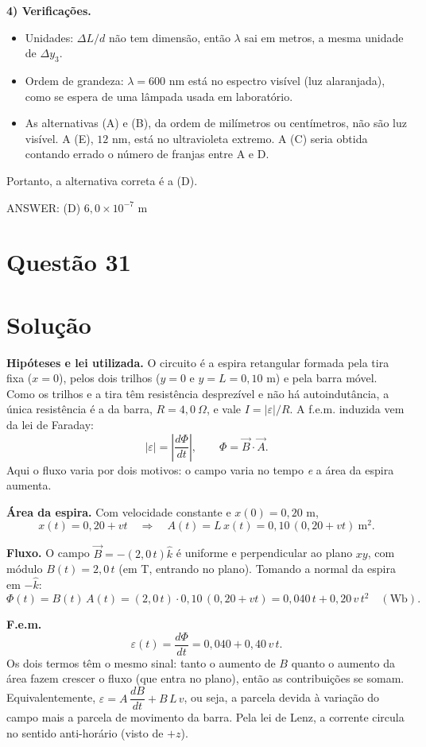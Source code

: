 \documentclass{article}%
\begin{document}
\textbf{4) Verificações.}
\begin{itemize}
\item Unidades: $\Delta L/d$ não tem dimensão, então $\lambda$ sai em metros, a mesma unidade de $\Delta y_3$.
\item Ordem de grandeza: $\lambda = 600$ nm está no espectro visível (luz alaranjada), como se espera de uma lâmpada usada em laboratório.
\item As alternativas (A) e (B), da ordem de milímetros ou centímetros, não são luz visível. A (E), $12$ nm, está no ultravioleta extremo. A (C) seria obtida contando errado o número de franjas entre A e D.
\end{itemize}

Portanto, a alternativa correta é a (D).

ANSWER: (D) $6{,}0\times10^{-7}$ m%
\newpage%
\section*{Questão 31}

\section*{Solução}

\textbf{Hipóteses e lei utilizada.} O circuito é a espira retangular formada pela tira fixa ($x=0$), pelos dois trilhos ($y=0$ e $y=L=0{,}10$ m) e pela barra móvel. Como os trilhos e a tira têm resistência desprezível e não há autoindutância, a única resistência é a da barra, $R=4{,}0\ \Omega$, e vale $I=|\varepsilon|/R$. A f.e.m. induzida vem da lei de Faraday:
\[
|\varepsilon| = \left|\frac{d\Phi}{dt}\right|, \qquad \Phi = \vec B\cdot \vec A .
\]
Aqui o fluxo varia por dois motivos: o campo varia no tempo \emph{e} a área da espira aumenta.

\textbf{Área da espira.} Com velocidade constante e $x(0)=0{,}20$ m,
\[
x(t)=0{,}20+vt \quad\Rightarrow\quad A(t)=L\,x(t)=0{,}10\,(0{,}20+vt)\ \text{m}^2 .
\]

\textbf{Fluxo.} O campo $\vec B=-(2{,}0\,t)\hat k$ é uniforme e perpendicular ao plano $xy$, com módulo $B(t)=2{,}0\,t$ (em T, entrando no plano). Tomando a normal da espira em $-\hat k$:
\[
\Phi(t)=B(t)\,A(t)=(2{,}0\,t)\cdot 0{,}10\,(0{,}20+vt)=0{,}040\,t+0{,}20\,v\,t^{2}\quad(\text{Wb}).
\]

\textbf{F.e.m.}
\[
\varepsilon(t)=\frac{d\Phi}{dt}=0{,}040+0{,}40\,v\,t .
\]
Os dois termos têm o mesmo sinal: tanto o aumento de $B$ quanto o aumento da área fazem crescer o fluxo (que entra no plano), então as contribuições se somam. Equivalentemente, $\varepsilon=A\,\dfrac{dB}{dt}+B\,L\,v$, ou seja, a parcela devida à variação do campo mais a parcela de movimento da barra. Pela lei de Lenz, a corrente circula no sentido anti-horário (visto de $+z$).
\end{document}
